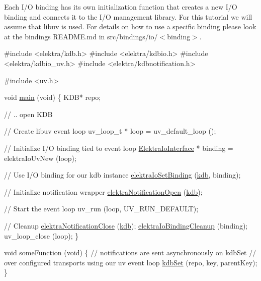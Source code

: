 Each I/O binding has its own initialization function that creates a new I/O binding and connects it to the I/O management library. For this tutorial we will assume that libuv is used. For details on how to use a specific binding please look at the bindings\textquotesingle{} R\+E\+A\+D\+M\+E.\+md in {\ttfamily src/bindings/io/$<$binding$>$}.


\begin{DoxyCode}
\textcolor{preprocessor}{#include <elektra/kdb.h>}
\textcolor{preprocessor}{#include <elektra/kdbio.h>}
\textcolor{preprocessor}{#include <elektra/kdbio\_uv.h>}
\textcolor{preprocessor}{#include <elektra/kdbnotification.h>}

\textcolor{preprocessor}{#include <uv.h>}

\textcolor{keywordtype}{void} \hyperlink{testio__doc_8c_a3c04138a5bfe5d72780bb7e82a18e627}{main} (\textcolor{keywordtype}{void})
\{
        KDB* repo;

        \textcolor{comment}{// .. open KDB}

        \textcolor{comment}{// Create libuv event loop}
        uv\_loop\_t * loop = uv\_default\_loop ();

        \textcolor{comment}{// Initialize I/O binding tied to event loop}
        \hyperlink{kdbio_8h_aabcd87b8c09d4d4c1033fc1baa417391}{ElektraIoInterface} * binding = elektraIoUvNew (loop);

  \textcolor{comment}{// Use I/O binding for our kdb instance}
  \hyperlink{io_8c_a187345483bdfbb404919c6797bc2db77}{elektraIoSetBinding} (\hyperlink{namespacekdb}{kdb}, binding);

        \textcolor{comment}{// Initialize notification wrapper}
        \hyperlink{notification_8c_aeae96154abdb5fdbf1b34a01e2b23e44}{elektraNotificationOpen} (\hyperlink{namespacekdb}{kdb});

        \textcolor{comment}{// Start the event loop}
        uv\_run (loop, UV\_RUN\_DEFAULT);

        \textcolor{comment}{// Cleanup}
  \hyperlink{notification_8c_a5685dafbd4131011365628d6d9213594}{elektraNotificationClose} (\hyperlink{namespacekdb}{kdb});
  \hyperlink{io_8c_a062e9d7d5305201dfe5ba437f3f03224}{elektraIoBindingCleanup} (binding);
        uv\_loop\_close (loop);
\}

\textcolor{keywordtype}{void} someFunction (\textcolor{keywordtype}{void})
\{
        \textcolor{comment}{// notifications are sent asynchronously on kdbSet}
        \textcolor{comment}{// over configured transports using our uv event loop}
        \hyperlink{group__kdb_ga11436b058408f83d303ca5e996832bcf}{kdbSet} (repo, key, parentKey);
\}
\end{DoxyCode}


